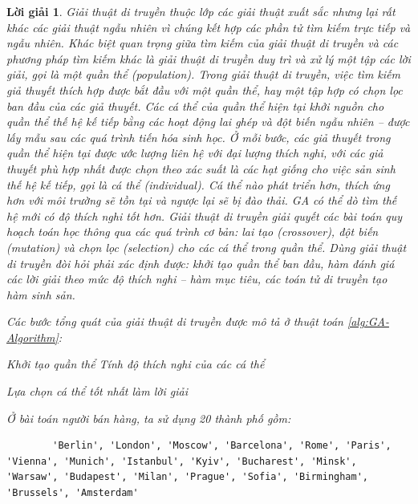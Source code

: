 \documentclass[14pt, a4paper]{article}
\theoremstyle{sltheorem}
\theoremstyle{soltheorem}
\newtheorem*{loigiai}{Lời giải}
\begin{document}
\begin{loigiai}
    Giải thuật di truyền thuộc lớp các giải thuật xuất sắc nhưng lại rất khác các giải thuật ngẫu nhiên vì chúng kết hợp các phần tử tìm kiếm trực tiếp và ngẫu nhiên. 
    Khác biệt quan trọng giữa tìm kiếm của giải thuật di truyền và các phương pháp tìm kiếm khác là giải thuật di truyền duy trì và xử lý một tập các lời giải, gọi là một quần thể (population). 
    Trong giải thuật di truyền, việc tìm kiếm giả thuyết thích hợp được bắt đầu với một quần thể, hay một tập hợp có chọn lọc ban đầu của các giả thuyết. 
    Các cá thể của quần thể hiện tại khởi nguồn cho quần thể thế hệ kế tiếp bằng các hoạt động lai ghép và đột biến ngẫu nhiên – được lấy mẫu sau các quá trình tiến hóa sinh học. 
    Ở mỗi bước, các giả thuyết trong quần thể hiện tại được ước lượng liên hệ với đại lượng thích nghi, với các giả thuyết phù hợp nhất được chọn theo xác suất là các hạt giống cho việc sản sinh thế hệ kế tiếp, gọi là cá thể (individual). 
    Cá thể nào phát triển hơn, thích ứng hơn với môi trường sẽ tồn tại và ngược lại sẽ bị đào thải. GA có thể dò tìm thế hệ mới có độ thích nghi tốt hơn. Giải thuật di truyền giải quyết các bài toán quy hoạch toán học thông qua các quá trình cơ bản: lai tạo (crossover), đột biến (mutation) và chọn lọc (selection) cho các cá thể trong quần thể. 
    Dùng giải thuật di truyền đòi hỏi phải xác định được: khởi tạo quần thể ban đầu, hàm đánh giá các lời giải theo mức độ thích nghi – hàm mục tiêu, các toán tử di truyền tạo hàm sinh sản.

    Các bước tổng quát của giải thuật di truyền được mô tả ở thuật toán \ref{alg:GA-Algorithm}:

    \begin{algorithm}[h!]
        \DontPrintSemicolon

        Khởi tạo quần thể\;
        Tính độ thích nghi của các cá thể\;

        Lựa chọn cá thể tốt nhất làm lời giải\;
        \;
        \caption{Các bước tổng quát của giải thuật di truyền}
        \label{alg:GA-Algorithm}
    \end{algorithm}

    Ở bài toán người bán hàng, ta sử dụng 20 thành phố gồm:

    \begin{verbatim}
        'Berlin', 'London', 'Moscow', 'Barcelona', 'Rome', 'Paris', 'Vienna', 'Munich', 'Istanbul', 'Kyiv', 'Bucharest', 'Minsk', 'Warsaw', 'Budapest', 'Milan', 'Prague', 'Sofia', 'Birmingham', 'Brussels', 'Amsterdam'
    \end{verbatim}


\end{loigiai}
\end{document}

